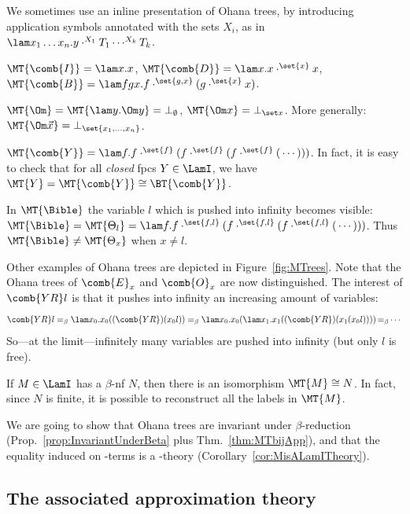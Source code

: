 We sometimes use an inline presentation of Ohana trees, 
by introducing application symbols annotated with the sets $X_i$, as in 
$\lam x_1\ldots x_n.y\cdot^{X_1}T_1\cdots^{X_k}T_k$.
\begin{example}\label{ex:MTs}\mbox{}
\bsub
\item $\MT{\comb{I}} = \lam x.x$, $\MT{\comb{D}} = \lam x.x\cdot^{\set{x}}x$, $\MT{\comb{B}} = \lam fgx.f\cdot^{\set{g,x}}(g\cdot^{\set{x}}x)$.
\item $\MT{\Om} = \MT{\lam y.\Om y} = \bot_{\emptyset}$, $\MT{\Om x} = \bot_{\set x}$. More generally: $\MT{\Om \vec x} = \bot_{\set{x_1,\dots,x_n}}$. 
\item  $\MT{\comb{Y}} = \lam f.f\cdot^{\set{f}}(f\cdot^{\set{f}}(f\cdot^{\set{f}}(\,\cdots)))$. 
	In fact, it is easy to check that for all \emph{closed} fpcs $Y\in\LamI$, we have $\MT{Y} = \MT{\comb{Y}} \cong \BT{\comb{Y}}$.
\item In $\MT{\Bible}$ the variable $l$ which is pushed into infinity becomes visible: $\MT{\Bible} =\MT{\Theta_l} = \lam f.f\cdot^{\set{f,l}}(f\cdot^{\set{f,l}}(f\cdot^{\set{f,l}}(\,\cdots)))$. Thus $\MT{\Bible} \neq \MT{\Theta_x}$ when $x\neq l$.
\esub
\end{example}

Other examples of Ohana trees are depicted in Figure~\ref{fig:MTrees}.
Note that the Ohana trees of $\comb{E}_x$ and $\comb{O}_x$ are now distinguished.
The interest of ${\comb{YR}l}$ is that it pushes into infinity an increasing amount of variables: 
\[\comb{YR}l =_\beta \lam x_0.x_0((\comb{YR})(x_0l)) =_\beta \lam x_0.x_0(\lam x_1.x_1((\comb{YR})(x_1(x_0l))))\, {=_\beta} \cdots\]
So---at the limit---infinitely many variables are pushed into infinity (but only $l$ is free).

\begin{remark} If $M\in\LamI$ has a $\beta$-nf $N$, then there is an isomorphism $\MT{M}\cong N$.
In fact, since $N$ is finite, it is possible to reconstruct all the labels in $\MT{M}$.  
\end{remark}

We are going to show that Ohana trees are invariant under $\beta$-reduction (Prop.~\ref{prop:InvariantUnderBeta} plus Thm.~\ref{thm:MTbijApp}), and that the equality induced on \lamI-terms is a \lamI-theory (Corollary~\ref{cor:MisALamITheory}).

\subsection{The associated approximation theory}

